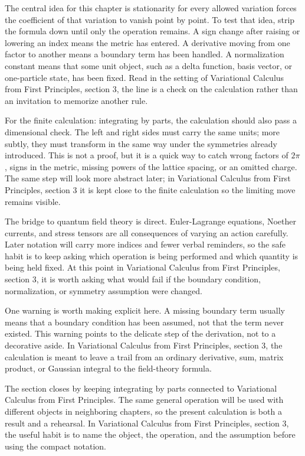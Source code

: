 The central idea for this chapter is stationarity for every allowed variation forces the coefficient of that variation to vanish point by point.  To test that idea, strip the formula down until only the operation remains.  A sign change after raising or lowering an index means the metric has entered.  A derivative moving from one factor to another means a boundary term has been handled.  A normalization constant means that some unit object, such as a delta function, basis vector, or one-particle state, has been fixed.  Read in the setting of Variational Calculus from First Principles, section 3, the line is a check on the calculation rather than an invitation to memorize another rule.

For the finite calculation: integrating by parts, the calculation should also pass a dimensional check.  The left and right sides must carry the same units; more subtly, they must transform in the same way under the symmetries already introduced.  This is not a proof, but it is a quick way to catch wrong factors of \(2\pi\), signs in the metric, missing powers of the lattice spacing, or an omitted charge.  The same step will look more abstract later; in Variational Calculus from First Principles, section 3 it is kept close to the finite calculation so the limiting move remains visible.

The bridge to quantum field theory is direct.  Euler-Lagrange equations, Noether currents, and stress tensors are all consequences of varying an action carefully.  Later notation will carry more indices and fewer verbal reminders, so the safe habit is to keep asking which operation is being performed and which quantity is being held fixed.  At this point in Variational Calculus from First Principles, section 3, it is worth asking what would fail if the boundary condition, normalization, or symmetry assumption were changed.

One warning is worth making explicit here.  A missing boundary term usually means that a boundary condition has been assumed, not that the term never existed.  This warning points to the delicate step of the derivation, not to a decorative aside.  In Variational Calculus from First Principles, section 3, the calculation is meant to leave a trail from an ordinary derivative, sum, matrix product, or Gaussian integral to the field-theory formula.

The section closes by keeping integrating by parts connected to Variational Calculus from First Principles.  The same general operation will be used with different objects in neighboring chapters, so the present calculation is both a result and a rehearsal.  In Variational Calculus from First Principles, section 3, the useful habit is to name the object, the operation, and the assumption before using the compact notation.



